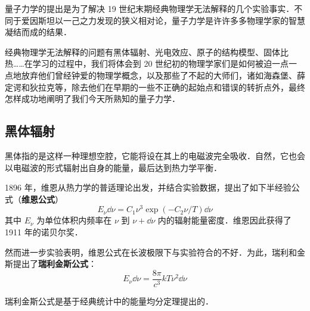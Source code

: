 
量子力学的提出是为了解决 19 世纪末期经典物理学无法解释的几个实验事实．不同于爱因斯坦以一己之力发现的狭义相对论，量子力学是许许多多物理学家的智慧凝结而成的结果．

经典物理学无法解释的问题有黑体辐射、光电效应、原子的结构模型、固体比热……在学习的过程中，我们将体会到 20 世纪初的物理学家们是如何被迫一点一点地放弃他们曾经钟爱的物理学概念，以及那些了不起的大师们，诸如海森堡、薛定谔和狄拉克等，除去他们在早期的一些不正确的起始点和错误的转折点外，最终怎样成功地阐明了我们今天所熟知的量子力学．

\subsection{黑体辐射}
黑体指的是这样一种理想空腔，它能将设在其上的电磁波完全吸收．自然，它也会以电磁波的形式辐射出自身的能量，最后达到热力学平衡．

1896 年，维恩从热力学的普适理论出发，并结合实验数据，提出了如下半经验公式（\textbf{维恩公式}）
\begin{equation}
E_\nu \dd \nu=C_1\nu^3 \exp(-C_2 \nu /T) \dd \nu
\end{equation}
其中 $E_\nu$ 为单位体积内频率在 $\nu$ 到 $\nu+\dd \nu$ 内的辐射能量密度．维恩因此获得了 1911 年的诺贝尔奖．

然而进一步实验表明，维恩公式在长波极限下与实验符合的不好．为此，瑞利和金斯提出了\textbf{瑞利金斯公式}：
\begin{equation}
E_\nu \dd \nu=\frac{8\pi}{c^3}kT\nu^2 \dd \nu
\end{equation}

瑞利金斯公式是基于经典统计中的能量均分定理提出的．